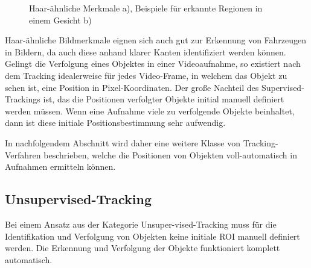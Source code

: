 \begin{figure}[H]
    \centering
    \qquad
    \caption[Haar-ähnliche Bildmerkmale]{Haar-ähnliche Merkmale a), Beispiele für erkannte Regionen in einem Gesicht b) \cite[]{DivyanshDwivedi2018}}
    \label{fig:grund_hair_like}
\end{figure}

Haar-ähnliche Bildmerkmale eignen sich auch gut zur Erkennung von Fahrzeugen in Bildern, da auch diese anhand klarer
Kanten identifiziert werden können.
Gelingt die Verfolgung eines Objektes in einer Videoaufnahme, so existiert nach dem Tracking idealerweise
für jedes Video-Frame, in welchem das Objekt zu sehen ist, eine Position in Pixel-Koordinaten.
Der große Nachteil des Supervised-Trackings ist, das die Positionen verfolgter Objekte initial
manuell definiert werden müssen. Wenn eine Aufnahme viele zu verfolgende Objekte beinhaltet, dann ist
diese initiale Positionsbestimmung sehr aufwendig.

In nachfolgendem Abschnitt wird daher eine weitere Klasse von Tracking-Verfahren beschrieben,
welche die Positionen von Objekten voll-automatisch in Aufnahmen ermitteln können.

\subsection{Unsupervised-Tracking}
\label{sec:unsupervised_tracking}

\begin{theorem}
    Bei einem Ansatz aus der Kategorie Unsuper-vised-Tracking muss für die Identifikation und Verfolgung
    von Objekten keine initiale ROI manuell definiert werden. Die Erkennung und Verfolgung der Objekte funktioniert
    komplett automatisch.
\end{theorem}

